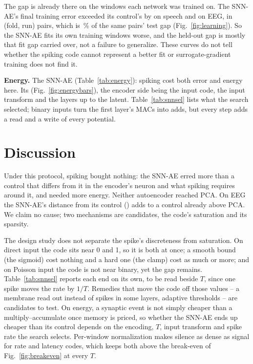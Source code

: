 \documentclass[conference]{IEEEtran}
\begin{document}
\par The gap is already there on the windows each network was trained on. The SNN-AE's final
training error exceeded its control's by \learnGapSpeech{} on speech and \learnGapEeg{} on EEG,
in \learnPairs{} (fold, run) pairs, which is \learnShare\,\% of the same pairs' test gap
(Fig.~\ref{fig:learning}). So the SNN-AE fits its own training windows worse, and the held-out
gap is mostly that fit gap carried over, not a failure to generalize. These curves do not tell
whether the spiking code cannot represent a better fit or surrogate-gradient training does not
find it.

\par \textbf{Energy.} The SNN-AE \energyVsControl{} (Table~\ref{tab:energy}): spiking cost both
error and energy here. Its \energySplit{} (Fig.~\ref{fig:energybars}), the encoder side being the
input code, the input transform and the layers up to the latent. Table~\ref{tab:snnsel} lists
what the search selected; binary inputs turn the first layer's MACs into adds, but every step
adds a read and a write of every potential.

\section{Discussion}
\label{sec:discussion}

\par Under this protocol, spiking bought nothing: the SNN-AE erred more than a control that
differs from it in the encoder's neuron and what spiking requires around it, and needed more
energy. Neither autoencoder reached PCA. On EEG the SNN-AE's distance from its control
(\sigGapEeg) adds to a control already \sigAnnPcaEeg{} above PCA. We claim no cause; two
mechanisms are candidates, the code's saturation and its sparsity.

\par The design study does not separate the spike's discreteness from saturation. On direct
input the code sits near 0 and 1, so it is both at once; a smooth bound (the sigmoid) cost
nothing and a hard one (the clamp) cost as much or more; and on Poisson input the code is not
near binary, yet the gap remains. Table~\ref{tab:snnsel} reports each end on its own, to be read
beside $T$, since one spike moves the rate by $1/T$. Remedies that move the code off those values
-- a membrane read out instead of spikes in some layers, adaptive thresholds -- are candidates to
test. On energy, a synaptic event is not simply cheaper than a multiply--accumulate once memory
is priced, so whether the SNN-AE ends up cheaper than its control depends on the encoding, $T$,
input transform and spike rate the search selects. Per-window normalization makes silence as
dense as signal for rate and latency codes, which keeps both above the break-even of
Fig.~\ref{fig:breakeven} at every $T$.
\end{document}
